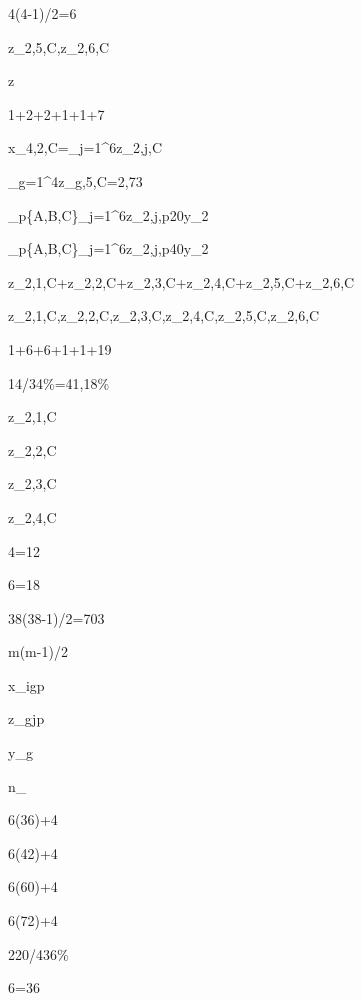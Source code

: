 4(4-1)/2=6

z_{2,5,C},z_{2,6,C}

z

1+2+2+1+1+7

x_{4,2,C}=\sum_{j=1}^{6}z_{2,j,C}

\sum_{g=1}^{4}z_{g,5,C}=2{,}73

\sum_{p\in\{A,B,C\}}\sum_{j=1}^{6}z_{2,j,p}\le20y_2

\sum_{p\in\{A,B,C\}}\sum_{j=1}^{6}z_{2,j,p}40y_2

z_{2,1,C}+z_{2,2,C}+z_{2,3,C}+z_{2,4,C}+z_{2,5,C}+z_{2,6,C}

z_{2,1,C},z_{2,2,C},z_{2,3,C},z_{2,4,C},z_{2,5,C},z_{2,6,C}

1+6+6+1+1+19

14/34\%=41{,}18\%

z_{2,1,C}

z_{2,2,C}

z_{2,3,C}

z_{2,4,C}

4=12

6=18

38(38-1)/2=703

m(m-1)/2

x_{igp}

z_{gjp}

y_g

n_{}

6(36)+4

6(42)+4

6(60)+4

6(72)+4

220/436\%

6=36

